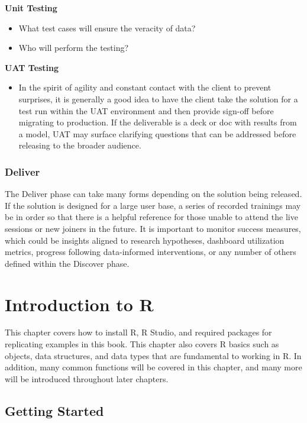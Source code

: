 \documentclass[]{book}
\providecommand{\tightlist}{%
  \setlength{\itemsep}{0pt}\setlength{\parskip}{0pt}}
\begin{document}
\textbf{Unit Testing}

\begin{itemize}
\tightlist
\item
  What test cases will ensure the veracity of data?
\item
  Who will perform the testing?
\end{itemize}

\textbf{UAT Testing}

\begin{itemize}
\tightlist
\item
  In the spirit of agility and constant contact with the client to prevent surprises, it is generally a good idea to have the client take the solution for a test run within the UAT environment and then provide sign-off before migrating to production. If the deliverable is a deck or doc with results from a model, UAT may surface clarifying questions that can be addressed before releasing to the broader audience.
\end{itemize}

\hypertarget{deliver}{%
\subsection{Deliver}\label{deliver}}

The Deliver phase can take many forms depending on the solution being released. If the solution is designed for a large user base, a series of recorded trainings may be in order so that there is a helpful reference for those unable to attend the live sessions or new joiners in the future. It is important to monitor success measures, which could be insights aligned to research hypotheses, dashboard utilization metrics, progress following data-informed interventions, or any number of others defined within the Discover phase.

\hypertarget{r-intro}{%
\chapter{Introduction to R}\label{r-intro}}

This chapter covers how to install R, R Studio, and required packages for replicating examples in this book. This chapter also covers R basics such as objects, data structures, and data types that are fundamental to working in R. In addition, many common functions will be covered in this chapter, and many more will be introduced throughout later chapters.

\hypertarget{getting-started-1}{%
\section{Getting Started}\label{getting-started-1}}
\end{document}
